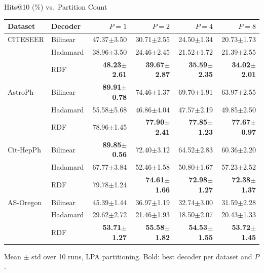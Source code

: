 \documentclass[aspectratio=169]{beamer}
\begin{document}
\begin{frame}{Hits@10 (\%) vs.\ Partition Count}
  \scriptsize
  \begin{tabular}{llrrrr}
    \toprule
    Dataset & Decoder & $P{=}1$ & $P{=}2$ & $P{=}4$ & $P{=}8$ \\
    \midrule
    CITESEER  & Bilinear  & 47.37$\pm$3.50 & 30.71$\pm$2.55 & 24.50$\pm$1.34 & 20.73$\pm$1.73 \\
              & Hadamard  & 38.96$\pm$3.50 & 24.46$\pm$2.45 & 21.52$\pm$1.72 & 21.39$\pm$2.55 \\
              & RDF       & \textbf{48.23$\pm$2.61} & \textbf{39.67$\pm$2.87} & \textbf{35.59$\pm$2.35} & \textbf{34.02$\pm$2.01} \\
    \midrule
    AstroPh   & Bilinear  & \textbf{89.91$\pm$0.78} & 74.46$\pm$1.37 & 69.70$\pm$1.91 & 63.97$\pm$2.55 \\
              & Hadamard  & 55.58$\pm$5.68 & 46.86$\pm$4.04 & 47.57$\pm$2.19 & 49.85$\pm$2.50 \\
              & RDF       & 78.96$\pm$1.45 & \textbf{77.90$\pm$2.41} & \textbf{77.85$\pm$1.23} & \textbf{77.67$\pm$0.97} \\
    \midrule
    Cit-HepPh & Bilinear  & \textbf{89.85$\pm$0.56} & 72.40$\pm$3.12 & 64.52$\pm$2.83 & 60.36$\pm$2.20 \\
              & Hadamard  & 67.77$\pm$3.84 & 52.46$\pm$1.58 & 50.80$\pm$1.67 & 57.23$\pm$2.52 \\
              & RDF       & 79.78$\pm$1.24 & \textbf{74.61$\pm$1.66} & \textbf{72.98$\pm$1.27} & \textbf{72.38$\pm$1.37} \\
    \midrule
    AS-Oregon & Bilinear  & 45.39$\pm$1.44 & 36.97$\pm$1.19 & 32.74$\pm$3.00 & 31.59$\pm$2.28 \\
              & Hadamard  & 29.62$\pm$2.72 & 21.46$\pm$1.93 & 18.50$\pm$2.07 & 20.43$\pm$1.33 \\
              & RDF       & \textbf{53.71$\pm$1.27} & \textbf{55.58$\pm$1.82} & \textbf{54.53$\pm$1.55} & \textbf{53.72$\pm$1.45} \\
    \bottomrule
  \end{tabular}

  \vspace{0.5em}
  \scriptsize Mean $\pm$ std over 10 runs, LPA partitioning. Bold: best decoder per dataset and $P$.
\end{frame}
\end{document}
